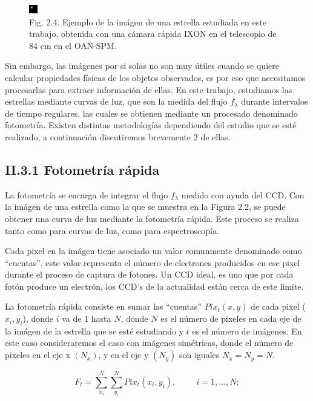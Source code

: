 \begin{figure}[h!]
  \centering
    \includegraphics[scale=8]{./figures/wasp74b.png}
   \caption{Fig. 2.4. Ejemplo de la imágen de una estrella estudiada en este trabajo, obtenida con una cámara rápida IXON en el telescopio de 84 cm en el OAN-SPM.}
    \label{fig_2_4_wasp74b}
\end{figure}

Sin embargo, las imágenes por si solas no son muy útiles cuando se quiere calcular propiedades físicas de los objetos observados, es por eso que necesitamos procesarlas para extraer información de ellas. En este trabajo, estudiamos las estrellas mediante curvas de luz, que son la medida del flujo $f_{\lambda}$ durante intervalos de tiempo regulares, las cuales se obtienen mediante un procesado denominado fotometría. Existen distintas metodologías dependiendo del estudio que se esté realizado, a continuación discutiremos brevemente 2 de ellas.

\subsection*{II.3.1 Fotometría rápida}

La fotometría se encarga de integrar el flujo $f_{\lambda}$ medido con ayuda del CCD. Con la imágen de una estrella como la que se muestra en la Figura 2.2, se puede obtener una curva de luz mediante la fotometría rápida. Este proceso se realiza tanto como para curvas de luz, como para espectroscopía.

Cada pixel en la imágen tiene asociado un valor comunmente denominado como ``cuentas'', este valor representa el número de electrones producidos en ese pixel durante el proceso de captura de fotones. Un CCD ideal, es uno que por cada fotón produce un electrón, los CCD's de la actualidad están cerca de este limite.

La fotometría rápida consiste en sumar las ``cuentas'' $Pix_{t}(x,y) $ de cada pixel ($x_{i},y_{i}$), donde $ i $ va de 1 hasta $ N $, donde $ N $ es el número de pixeles en cada eje de la imágen de la estrella que se esté estudiando y $ t $ es el número de imágenes. En este caso consideraremos el caso con imágenes simétricas, donde el número de pixeles en el eje x $(N_{x})$, y en el eje y $(N_{y})$ son iguales $N_{x}=N_{y}=N$. 

\begin{equation}
  \displaystyle F_{t} = \sum_{x_{i}}^{N} \sum_{y_{i}}^{N} Pix_{t}(x_{i},y_{i}),\hspace{1cm}i=1,...,N;
\end{equation}

